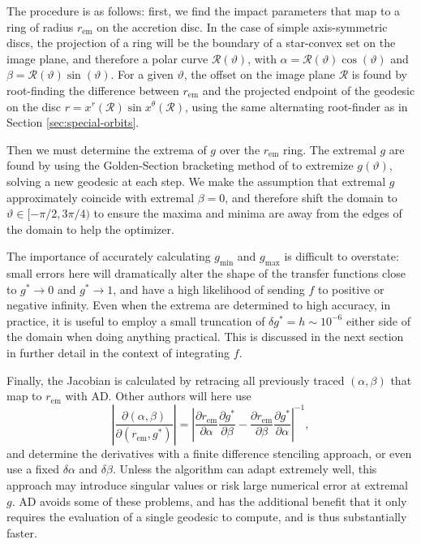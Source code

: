\documentclass[fleqn,usenatbib]{mnras}
\newcommand{\pderiv}[2]{\frac{\partial #1}{\partial #2}}
\begin{document}
The procedure is as follows: first, we find the impact parameters that map to a
ring of radius $r_\text{em}$ on the accretion disc. In the case of simple
axis-symmetric discs, the projection of a ring will be the boundary of a
star-convex set on the image plane, and therefore a polar curve
$\mathcal{R}(\vartheta)$, with $\alpha = \mathcal{R}(\vartheta) \cos(\vartheta)$
and $\beta = \mathcal{R}(\vartheta) \sin(\vartheta)$. For a given $\vartheta$,
the offset on the image plane $\mathcal{R}$ is found by root-finding the
difference between $r_\text{em}$ and the projected endpoint of the geodesic on
the disc $r = x^r (\mathcal{R}) \sin x^\theta(\mathcal{R})$, using the same
alternating root-finder as in Section \ref{sec:special-orbits}.

Then we must determine the extrema of $g$ over the $r_\text{em}$ ring. The
extremal $g$ are found by using the Golden-Section bracketing method of
\cite{Optim.jl-2018} to extremize $g(\vartheta)$, solving a new geodesic
at each step. We make the assumption that extremal $g$ approximately coincide
with extremal $\beta = 0$, and therefore shift the domain to $\vartheta \in [
-\pi/2, 3\pi/4)$ to ensure the maxima and minima are away from the edges of the
domain to help the optimizer.

The importance of accurately calculating $g_\text{min}$ and $g_\text{max}$ is
difficult to overstate: small errors here will dramatically alter the shape of
the transfer functions close to $g^\ast \rightarrow 0$ and $g^\ast \rightarrow
1$, and have a high likelihood of sending $f$ to positive or negative infinity.
Even when the extrema are determined to high accuracy, in practice, it is useful
to employ a small truncation of $\delta g^\ast = h \sim 10^{-6}$ either side
of the domain when doing anything practical. This is discussed in the next
section in further detail in the context of integrating $f$.

Finally, the Jacobian is calculated by retracing all previously traced $(\alpha,
\beta)$ that map to $r_\text{em}$ with AD. Other authors will here use
\begin{equation}
    \left\lvert
    \pderiv{(\alpha, \beta)}{(r_\text{em}, g^\ast)}
    \right\rvert
    =
    \left\lvert
    \pderiv{r_\text{em}}{\alpha}\pderiv{g^\ast}{\beta}
    -
    \pderiv{r_\text{em}}{\beta}\pderiv{g^\ast}{\alpha}
    \right\rvert^{-1},
\end{equation}
and determine the derivatives with a finite difference stenciling approach, or
even use a fixed $\delta \alpha$ and $\delta \beta$. Unless the algorithm can
adapt extremely well, this approach may introduce singular values or risk large
numerical error at extremal $g$. AD avoids some of these problems, and has the
additional benefit that it only requires the evaluation of a single geodesic to
compute, and is thus substantially faster.
\end{document}
